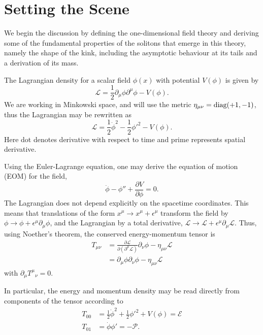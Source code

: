 \documentclass[11pt, oneside,titlepage]{article}  	%
\numberwithin{equation}{section}
\begin{document}
\section{Setting the Scene} \label{set_scene}
We begin the discussion by defining the  one-dimensional field theory and deriving some of the fundamental properties of the solitons that emerge in this theory, namely the shape of the kink, including the asymptotic behaviour at its tails and a derivation of its mass.\par
The Lagrangian density for a scalar field $\phi(x)$ with potential $V(\phi)$ is given by
\begin{equation}\label{lagrangian}
\mathcal{L} = \frac{1}{2} \partial_\mu \phi \partial^\mu \phi  - V(\phi).
\end{equation} 
We are working in Minkowski space, and will use the metric $\eta_{\mu\nu} = \textup{diag}(+1,-1)$, thus the Lagrangian may be rewritten as
\begin{equation}
\mathcal{L} = \frac{1}{2}\dot{\phi}^2 -  \frac{1}{2}{\phi'}^2   - V(\phi).
\end{equation}
Here dot denotes derivative with respect to time and prime represents spatial derivative.\par
Using the Euler-Lagrange equation, one may derive the equation of motion (EOM) for the field,
\begin{equation}\label{EOM}
\ddot{\phi} - {\phi}'' + \frac{\partial V}{\partial \phi} = 0.
\end{equation}
The Lagrangian does not depend explicitly on the spacetime coordinates. This means that translations of the form $x^\mu \rightarrow x^\mu + \epsilon ^\mu$ transform the field by $\phi \rightarrow \phi + \epsilon^\mu \partial_\mu \phi$, and the Lagrangian by a total derivative, $\mathcal{L}\rightarrow \mathcal{L} + \epsilon^\mu \partial_\mu \mathcal{L}$. Thus, using Noether's theorem, the conserved energy-momentum tensor is
\begin{align}
T_{\mu \nu} &= \frac{\partial \mathcal{L}}{\partial \left (\partial^\mu \mathcal{L}\right )} \partial_\nu\phi - \eta_{\mu\nu} \mathcal{L}  \nonumber \\
&=  \partial_\mu\phi \partial_\nu\phi - \eta_{\mu\nu} \mathcal{L}  
\end{align}
with $\partial_{\mu}{T^{\mu}}_{\nu} = 0$.\par
In particular, the energy and momentum density may be read directly from components of the tensor according to
 \begin{align}
T_{00} &= \frac{1}{2}\dot{\phi}^2 +  \frac{1}{2}{\phi'}^2   +V(\phi) = \mathcal{E} \label{energy}\\
T_{01} &= \dot{\phi} \phi'  = -\mathcal{P}. \label{momentum}
\end{align}\par
\end{document}
